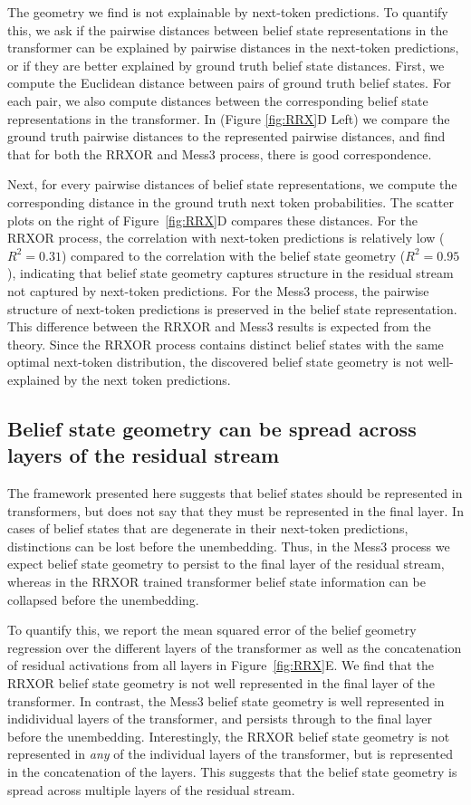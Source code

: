 \documentclass{article}
\begin{document}
The geometry we find is not explainable by next-token predictions. To quantify this, we ask if the pairwise distances between belief state representations in the transformer can be explained by pairwise distances in the next-token predictions, or if they are better explained by ground truth belief state distances. First, we compute the Euclidean distance between pairs of ground truth belief states. For each pair, we also compute distances between the corresponding belief state representations in the transformer. In (Figure \ref{fig:RRX}D Left) we compare the ground truth pairwise distances to the represented pairwise distances, and find that for both the RRXOR and Mess3 process, there is good correspondence.

Next, for every pairwise distances of belief state representations, we compute the corresponding distance in the ground truth next token probabilities. The scatter plots on the right of Figure~\ref{fig:RRX}D compares these distances. For the RRXOR process, the correlation with next-token predictions is relatively low ($R^2 = 0.31$) compared to the correlation with the belief state geometry ($R^2 = 0.95$), indicating that belief state geometry captures structure in the residual stream not captured by next-token predictions. For the Mess3 process, the pairwise structure of next-token predictions is preserved in the belief state representation. This difference between the RRXOR and Mess3 results is expected from the theory. Since the RRXOR process contains distinct belief states with the same optimal next-token distribution, the discovered belief state geometry is not well-explained by the next token predictions.

\subsection{Belief state geometry can be spread across layers of the residual stream}

The framework presented here suggests that belief states should be represented in transformers, but does not say that they must be represented in the final layer. In cases of belief states that are degenerate in their next-token predictions, distinctions can be lost before the unembedding. Thus, in the Mess3 process we expect belief state geometry to persist to the final layer of the residual stream, whereas in the RRXOR trained transformer belief state information can be collapsed before the unembedding.

To quantify this, we report the mean squared error of the belief geometry regression over the different layers of the transformer as well as the concatenation of residual activations from all layers in Figure~\ref{fig:RRX}E. We find that the RRXOR belief state geometry is not well represented in the final layer of the transformer.
In contrast, the Mess3 belief state geometry is well represented in indidividual layers of the transformer, and persists through to the final layer before the unembedding.
Interestingly, the RRXOR belief state geometry is not represented in \emph{any} of the individual layers of the transformer, but is represented in the concatenation of the layers. This suggests that the belief state geometry is spread across multiple layers of the residual stream.
\end{document}

